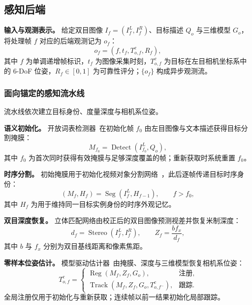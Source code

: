 \documentclass[review]{vgtc}
\begin{document}
\subsection{感知后端}\label{sec:perception}

\textbf{输入与观测表示。}
给定双目图像 $I_f = (I_f^L, I_f^R)$、目标描述 $Q_o$ 与三维模型 $G_o$，将处理帧 $f$ 对应的后端观测记为 $o_f$：
\begin{equation}
o_f = (f, t_f, T_{o,f}^{c}, R_f),
\label{eq:observation}
\end{equation}
其中 $f$ 为单调递增帧标识，$t_f$ 为图像采集时刻，$T_{o,f}^{c}$ 为目标在左目相机坐标系中的 6-DoF 位姿，$R_f \in [0,1]$ 为可靠性评分；$\{o_f\}$ 构成异步观测流。

\subsubsection{面向锚定的感知流水线}

流水线依次建立目标身份、度量深度与相机系位姿。

\textbf{语义初始化。}
开放词表检测器~\cite{yoloe2025}在初始化帧 $f_0$ 由左目图像与文本描述获得目标分割掩膜：
\begin{equation}
M_{f_0} = \operatorname{Detect}(I_{f_0}^{L}, Q_o),
\label{eq:detect}
\end{equation}
其中 $f_0$ 为首次同时获得有效掩膜与足够深度覆盖的帧；重新获取时系统重置 $f_0$。

\textbf{时序分割。}
初始掩膜用于初始化视频对象分割网络~\cite{cutie2024}，此后逐帧传递目标时序身份：
\begin{equation}
(M_f, H_f) = \operatorname{Seg}(I_f^{L}, H_{f-1}), \qquad f > f_0,
\label{eq:seg}
\end{equation}
其中 $H_f$ 为用于维持同一目标实例身份的时序外观记忆。

\textbf{双目深度恢复。}
立体匹配网络由校正后的双目图像预测视差并恢复米制深度：
\begin{equation}
d_f = \operatorname{Stereo}(I_f^{L}, I_f^{R}), \qquad Z_f = \frac{b f_x}{d_f},
\label{eq:depth}
\end{equation}
其中 $b$ 与 $f_x$ 分别为双目基线距离和像素焦距。

\textbf{零样本位姿估计。}
模型驱动估计器~\cite{foundationpose2024}由掩膜、深度与三维模型恢复相机系位姿：
\begin{equation}
T_{o,f}^{c} =
\begin{cases}
\operatorname{Reg}(M_f, Z_f, G_o), & \text{注册}, \\
\operatorname{Track}(M_f, Z_f, G_o, T_{o,f^-}^{c}), & \text{跟踪}.
\end{cases}
\label{eq:pose}
\end{equation}
全局注册仅用于初始化与重新获取；连续帧以前一结果初始化局部跟踪。
\end{document}
